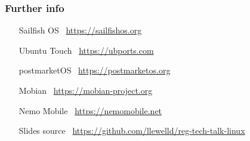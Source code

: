 \documentclass[
	notes=none,
	aspectratio=169
]{beamer}
\begin{document}
\begin{frame}[fragile]
\frametitle{Further info}
\setlength{\leftmargini}{7.0em}
\vspace{0.8cm}

\begin{itemize}
\setlength{\parskip}{1.0em}
\item[Sailfish OS] \, \url{https://sailfishos.org}
\item[Ubuntu Touch] \, \url{https://ubports.com}
\item[postmarketOS] \, \url{https://postmarketos.org}
\item[Mobian] \, \url{https://mobian-project.org}
\item[Nemo Mobile] \, \url{https://nemomobile.net}
\item[Slides source] \, \url{https://github.com/llewelld/reg-tech-talk-linux}
\end{itemize}

\end{frame}

\end{document}
